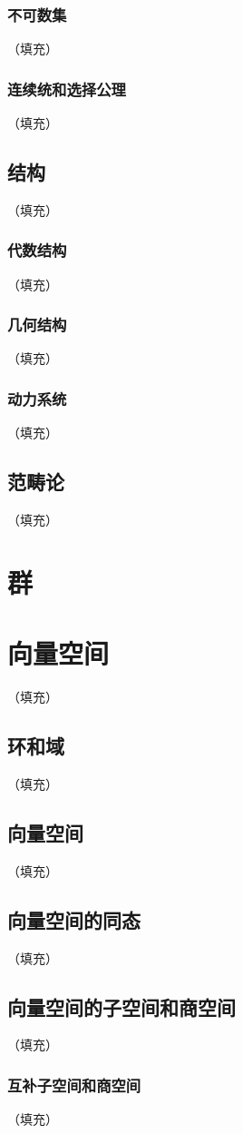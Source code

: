 \documentclass[hyperref,UTF8]{ctexbook}
\begin{document}
\subsection{不可数集}（填充）
\subsection{连续统和选择公理}（填充）
\section{结构}（填充）
\subsection{代数结构}（填充）
\subsection{几何结构}（填充）
\subsection{动力系统}（填充）
\section{范畴论}（填充）
\chapter{群}

\chapter{向量空间}（填充）
\section{环和域}（填充）
\section{向量空间}（填充）
\section{向量空间的同态}（填充）
\section{向量空间的子空间和商空间}（填充）
\subsection{互补子空间和商空间}（填充）
\end{document}
